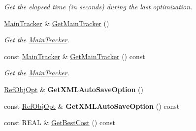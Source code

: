 \begin{DoxyCompactItemize}
\begin{DoxyCompactList}\small\item\em Get the elapsed time (in seconds) during the last optimization. \end{DoxyCompactList}\item 
\mbox{\label{class_obj_cryst_1_1_optimization_obj_afffb78f24b0988d416c80e6c931bef17}} 
\mbox{\hyperlink{class_obj_cryst_1_1_main_tracker}{Main\+Tracker}} \& \mbox{\hyperlink{class_obj_cryst_1_1_optimization_obj_afffb78f24b0988d416c80e6c931bef17}{Get\+Main\+Tracker}} ()
\begin{DoxyCompactList}\small\item\em Get the \mbox{\hyperlink{class_obj_cryst_1_1_main_tracker}{Main\+Tracker}}. \end{DoxyCompactList}\item 
\mbox{\label{class_obj_cryst_1_1_optimization_obj_ae45467f5d7058d3690289a8be7b2aaa1}} 
const \mbox{\hyperlink{class_obj_cryst_1_1_main_tracker}{Main\+Tracker}} \& \mbox{\hyperlink{class_obj_cryst_1_1_optimization_obj_ae45467f5d7058d3690289a8be7b2aaa1}{Get\+Main\+Tracker}} () const
\begin{DoxyCompactList}\small\item\em Get the \mbox{\hyperlink{class_obj_cryst_1_1_main_tracker}{Main\+Tracker}}. \end{DoxyCompactList}\item 
\mbox{\label{class_obj_cryst_1_1_optimization_obj_a206a676cc6d7aad31f30842d42d3b057}} 
\mbox{\hyperlink{class_obj_cryst_1_1_ref_obj_opt}{Ref\+Obj\+Opt}} \& {\bfseries Get\+X\+M\+L\+Auto\+Save\+Option} ()
\item 
\mbox{\label{class_obj_cryst_1_1_optimization_obj_af2479fa6744b4701ce7f1b57c68ea593}} 
const \mbox{\hyperlink{class_obj_cryst_1_1_ref_obj_opt}{Ref\+Obj\+Opt}} \& {\bfseries Get\+X\+M\+L\+Auto\+Save\+Option} () const
\item 
\mbox{\label{class_obj_cryst_1_1_optimization_obj_ac18b6c30578736049c326f25d822ef0b}} 
const R\+E\+AL \& \mbox{\hyperlink{class_obj_cryst_1_1_optimization_obj_ac18b6c30578736049c326f25d822ef0b}{Get\+Best\+Cost}} () const

\end{DoxyCompactItemize}
